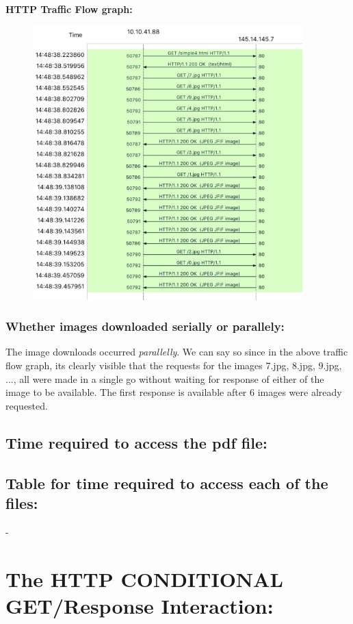 \documentclass[]{report}
\begin{document}
\textbf{HTTP Traffic Flow graph:}
\begin{figure}[H]
	\vspace{0pt}
	\includegraphics[height = 300pt, keepaspectratio]{Snapshots/q1/simple4/1_4_9.png}
\end{figure}
\subsubsection{Whether images downloaded serially or parallely:}
The image downloads occurred \textit{parallelly}. We can say so since in the above traffic flow graph, its clearly visible that the requests for the images 7.jpg, 8.jpg, 9.jpg, ..., all were made in a single go without waiting for response of either of the image to be available. The first response is available after 6 images were already requested. 
\subsection{Time required to access the pdf file:}

\subsection{Table for time required to access each of the files:}
-


\section{The HTTP CONDITIONAL GET/Response Interaction:}
\end{document}
